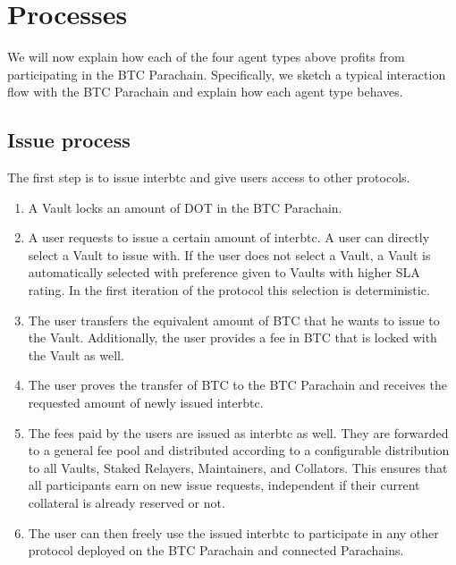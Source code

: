 \documentclass[a4paper,10pt,english]{sphinxmanual}
\begin{document}
\section{Processes}
\label{\detokenize{economics/incentives:processes}}
We will now explain how each of the four agent types above profits from participating in the BTC Parachain. Specifically, we sketch a typical interaction ﬂow with the BTC Parachain and explain how each agent type behaves.


\subsection{Issue process}
\label{\detokenize{economics/incentives:issue-process}}
The first step is to issue interbtc and give users access to other protocols.
\begin{enumerate}
%
\item {} 
A Vault locks an amount of DOT in the BTC Parachain.

\item {} 
A user requests to issue a certain amount of interbtc. A user can directly select a Vault to issue with. If the user does not select a Vault, a Vault is automatically selected with preference given to Vaults with higher SLA rating. In the first iteration of the protocol this selection is deterministic.

\item {} 
The user transfers the equivalent amount of BTC that he wants to issue to the Vault. Additionally, the user provides a fee in BTC that is locked with the Vault as well.

\item {} 
The user proves the transfer of BTC to the BTC Parachain and receives the requested amount of newly issued interbtc.

\item {} 
The fees paid by the users are issued as interbtc as well. They are forwarded to a general fee pool and distributed according to a configurable distribution to all Vaults, Staked Relayers, Maintainers, and Collators. This ensures that all participants earn on new issue requests, independent if their current collateral is already reserved or not.

\item {} 
The user can then freely use the issued interbtc to participate in any other protocol deployed on the BTC Parachain and connected Parachains.

\end{enumerate}
\end{document}

